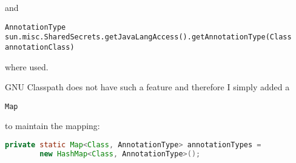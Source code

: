 \documentclass[a4paper, 10pt, titlepage]{scrartcl} %
\begin{document}
and \begin{scriptsize}\verb|AnnotationType|\hspace{0.0pt}\verb| |\hspace{0.0pt}\verb|sun|\hspace{0.0pt}\verb|.|\hspace{0.0pt}\verb|misc|\hspace{0.0pt}\verb|.|\hspace{0.0pt}\verb|SharedSecrets|\hspace{0.0pt}\verb|.|\hspace{0.0pt}\verb|getJavaLangAccess|\hspace{0.0pt}\verb|(|\hspace{0.0pt}\verb||\hspace{0.0pt}\verb|)|\hspace{0.0pt}\verb||\hspace{0.0pt}\verb|.|\hspace{0.0pt}\verb|getAnnotationType|\hspace{0.0pt}\verb|(|\hspace{0.0pt}\verb|Class|\hspace{0.0pt}\verb| |\hspace{0.0pt}\verb|annotationClass|\hspace{0.0pt}\verb|)|\hspace{0.0pt}\verb||\end{scriptsize}
where used.

GNU Classpath does not have such a feature and therefore I simply added a
\begin{scriptsize}\verb|Map|\end{scriptsize} to maintain the mapping:
\begin{lstlisting}[language=Java,firstnumber=50]
    private static Map<Class, AnnotationType> annotationTypes =
        new HashMap<Class, AnnotationType>();
\end{lstlisting}
\end{document}
